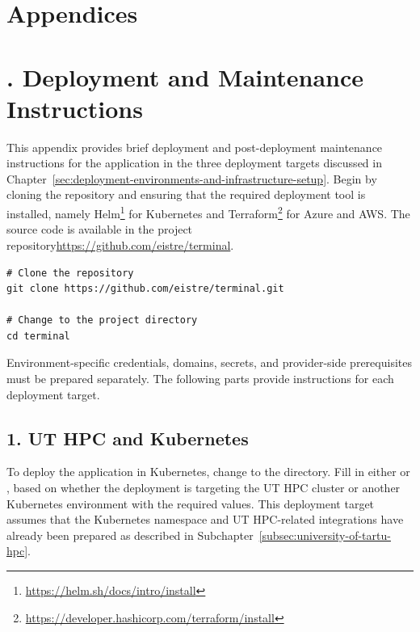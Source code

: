 \section*{Appendices} \label{sec:appendices} 

\appendix
{}


\section*{\thesection. Deployment and Maintenance Instructions} \label{app:deployment-and-maintenance-instructions}
This appendix provides brief deployment and post-deployment maintenance instructions for the application in the three deployment targets discussed in Chapter~\ref{sec:deployment-environments-and-infrastructure-setup}.
Begin by cloning the repository and ensuring that the required deployment tool is installed, namely Helm\footnote{\url{https://helm.sh/docs/intro/install}} for Kubernetes and Terraform\footnote{\url{https://developer.hashicorp.com/terraform/install}} for Azure and AWS\@.
The source code is available in the project repository\url{https://github.com/eistre/terminal}.

\begin{verbatim}
# Clone the repository
git clone https://github.com/eistre/terminal.git

# Change to the project directory
cd terminal
\end{verbatim}

Environment-specific credentials, domains, secrets, and provider-side prerequisites must be prepared separately.
The following parts provide instructions for each deployment target.

\subsection*{1. UT HPC and Kubernetes}
To deploy the application in Kubernetes, change to the  directory.
Fill in either  or , based on whether the deployment is targeting the UT HPC cluster or another Kubernetes environment with the required values.
This deployment target assumes that the Kubernetes namespace and UT HPC-related integrations have already been prepared as described in Subchapter~\ref{subsec:university-of-tartu-hpc}.

